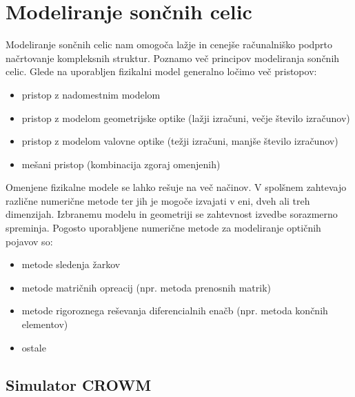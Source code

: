 \documentclass[a4paper,twoside,openright,12pt,slovene]{book}
\begin{document}
\section{Modeliranje sončnih celic}

Modeliranje sončnih celic nam omogoča lažje in cenejše računalniško podprto načrtovanje kompleksnih struktur. Poznamo več principov modeliranja sončnih celic. Glede na uporabljen fizikalni model generalno ločimo več pristopov:

\begin{itemize}
    \item pristop z nadomestnim modelom
    \item pristop z modelom geometrijske optike (lažji izračuni, večje število izračunov)
    \item pristop z modelom valovne optike (težji izračuni, manjše število izračunov)
    \item mešani pristop (kombinacija zgoraj omenjenih)
\end{itemize}

Omenjene fizikalne modele se lahko rešuje na več načinov. V spolšnem zahtevajo različne numerične metode ter jih je mogoče izvajati v eni, dveh ali treh dimenzijah. Izbranemu modelu in geometriji se zahtevnost izvedbe sorazmerno spreminja.\cite{10.1016/J.SOLMAT.2014.09.026} Pogosto uporabljene numerične metode za modeliranje optičnih pojavov so:
\begin{itemize}
    \item metode sledenja žarkov
    \item metode matričnih opreacij (npr. metoda prenosnih matrik)
    \item metode rigoroznega reševanja diferencialnih enačb (npr. metoda končnih elementov)
    \item ostale
\end{itemize}



\subsection{Simulator CROWM}
\end{document}
